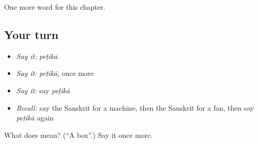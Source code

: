 \begin{grammarlens}[title={What you've built}]
One more word for this chapter.
\end{grammarlens}

\subsection*{Your turn}
\begin{itemize}
\raggedright
  \item \emph{Say it:} \emph{peṭikā}
  \item \emph{Say it:} \emph{peṭikā}, once more
  \item \emph{Say it:} say \emph{peṭikā}
  \item \emph{Recall:} say the Sanskrit for a machine, then the Sanskrit for a fan, then say \emph{peṭikā} again
\end{itemize}

\begin{tcolorbox}[breakable,colback=teal!4,colframe=teal!35!black,title={Before you move on}]
What does  mean? (\textquotedblleft{}A box\textquotedblright{}.) Say it once more.
\end{tcolorbox}
